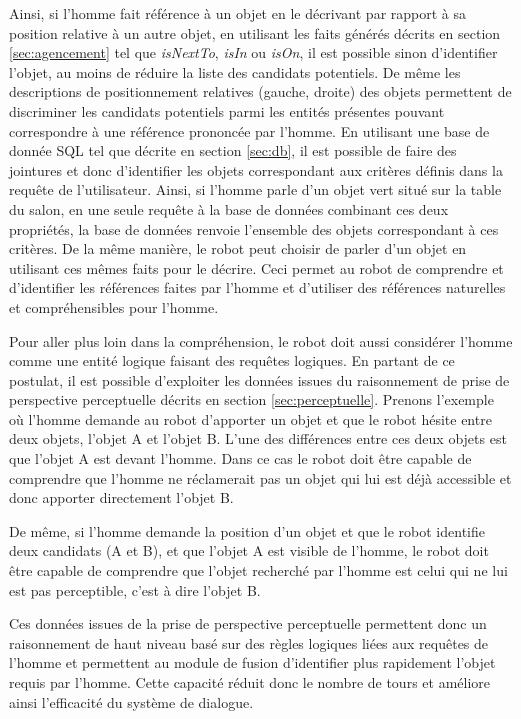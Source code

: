 \documentclass[a4paper,11pt,twoside]{StyleThese}
\begin{document}
Ainsi, si l'homme fait référence à un objet en le décrivant par rapport à sa position relative à un autre objet, en utilisant les faits générés décrits en section \ref{sec:agencement} tel que \textit{isNextTo}, \textit{isIn} ou \textit{isOn}, il est possible sinon d'identifier l'objet, au moins de réduire la liste des candidats potentiels. De même les descriptions de positionnement relatives (gauche, droite) des objets permettent de discriminer les candidats potentiels parmi les entités présentes pouvant correspondre à une référence prononcée par l'homme.
En utilisant une base de donnée SQL tel que décrite en section \ref{sec:db}, il est possible de faire des jointures et donc d'identifier les objets correspondant aux critères définis dans la requête de l'utilisateur.
Ainsi, si l'homme parle d'un objet vert situé sur la table du salon, en une seule requête à la base de données combinant ces deux propriétés, la base de données renvoie l'ensemble des objets correspondant à ces critères.
De la même manière, le robot peut choisir de parler d'un objet en utilisant ces mêmes faits pour le décrire.
Ceci permet au robot de comprendre et d'identifier les références faites par l'homme et d'utiliser des références naturelles et compréhensibles pour l'homme.

Pour aller plus loin dans la compréhension, le robot doit aussi considérer l'homme comme une entité logique faisant des requêtes logiques. En partant de ce postulat, il est possible d'exploiter les données issues du raisonnement de prise de perspective perceptuelle décrits en section \ref{sec:perceptuelle}.
Prenons l'exemple où l'homme demande au robot d'apporter un objet et que le robot hésite entre deux objets, l'objet A et l'objet B. L'une des différences entre ces deux objets est que l'objet A est devant l'homme. Dans ce cas le robot doit être capable de comprendre que l'homme ne réclamerait pas un objet qui lui est déjà accessible et donc apporter directement l'objet B.

De même, si l'homme demande la position d'un objet et que le robot identifie deux candidats (A et B), et que l'objet A est visible de l'homme, le robot doit être capable de comprendre que l'objet recherché par l'homme est celui qui ne lui est pas perceptible, c'est à dire l'objet B.

Ces données issues de la prise de perspective perceptuelle permettent donc un raisonnement de haut niveau basé sur des règles logiques liées aux requêtes de l'homme et permettent au module de fusion d'identifier plus rapidement l'objet requis par l'homme. Cette capacité réduit donc le nombre de tours et améliore ainsi l'efficacité du système de dialogue.
\end{document}
